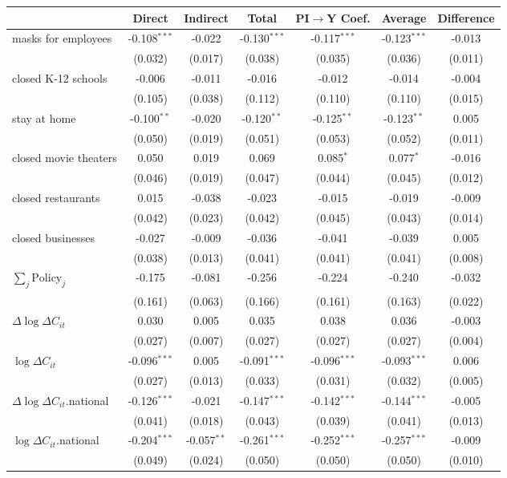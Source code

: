 
\begin{tabular}{lccccc|>{}c}
\toprule
  & Direct & Indirect & Total & PI$\to$Y Coef. & Average & Difference\\
\midrule
masks for employees & -0.108$^{***}$ & -0.022 & -0.130$^{***}$ & -0.117$^{***}$ & -0.123$^{***}$ & -0.013\\
 & (0.032) & (0.017) & (0.038) & (0.035) & (0.036) & (0.011)\\
closed K-12 schools & -0.006 & -0.011 & -0.016 & -0.012 & -0.014 & -0.004\\
 & (0.105) & (0.038) & (0.112) & (0.110) & (0.110) & (0.015)\\
stay at home & -0.100$^{**}$ & -0.020 & -0.120$^{**}$ & -0.125$^{**}$ & -0.123$^{**}$ & 0.005\\
 & (0.050) & (0.019) & (0.051) & (0.053) & (0.052) & (0.011)\\
closed movie theaters & 0.050 & 0.019 & 0.069 & 0.085$^{*}$ & 0.077$^{*}$ & -0.016\\
 & (0.046) & (0.019) & (0.047) & (0.044) & (0.045) & (0.012)\\
closed restaurants & 0.015 & -0.038 & -0.023 & -0.015 & -0.019 & -0.009\\
 & (0.042) & (0.023) & (0.042) & (0.045) & (0.043) & (0.014)\\
closed businesses & -0.027 & -0.009 & -0.036 & -0.041 & -0.039 & 0.005\\
 & (0.038) & (0.013) & (0.041) & (0.041) & (0.041) & (0.008)\\
$\sum_j \mathrm{Policy}_j$ & -0.175 & -0.081 & -0.256 & -0.224 & -0.240 & -0.032\\
 & (0.161) & (0.063) & (0.166) & (0.161) & (0.163) & (0.022)\\
$\Delta \log \Delta C_{it}$ & 0.030 & 0.005 & 0.035 & 0.038 & 0.036 & -0.003\\
 & (0.027) & (0.007) & (0.027) & (0.027) & (0.027) & (0.004)\\
$\log \Delta C_{it}$ & -0.096$^{***}$ & 0.005 & -0.091$^{***}$ & -0.096$^{***}$ & -0.093$^{***}$ & 0.006\\
 & (0.027) & (0.013) & (0.033) & (0.031) & (0.032) & (0.005)\\
$\Delta \log \Delta C_{it}$.national & -0.126$^{***}$ & -0.021 & -0.147$^{***}$ & -0.142$^{***}$ & -0.144$^{***}$ & -0.005\\
 & (0.041) & (0.018) & (0.043) & (0.039) & (0.041) & (0.013)\\
$\log \Delta C_{it}$.national & -0.204$^{***}$ & -0.057$^{**}$ & -0.261$^{***}$ & -0.252$^{***}$ & -0.257$^{***}$ & -0.009\\
 & (0.049) & (0.024) & (0.050) & (0.050) & (0.050) & (0.010)\\
\bottomrule
\end{tabular}